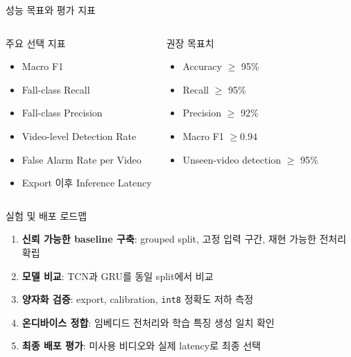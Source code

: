 \documentclass[aspectratio=169]{beamer}
\begin{document}
\begin{frame}{성능 목표와 평가 지표}
  \begin{columns}[T]
    \begin{block}{주요 선택 지표}
      \begin{itemize}
        \item Macro F1
        \item Fall-class Recall
        \item Fall-class Precision
        \item Video-level Detection Rate
        \item False Alarm Rate per Video
        \item Export 이후 Inference Latency
      \end{itemize}
    \end{block}

    \begin{block}{권장 목표치}
      \begin{itemize}
        \item Accuracy $\geq$ 95\%
        \item Recall $\geq$ 95\%
        \item Precision $\geq$ 92\%
        \item Macro F1 $\geq 0.94$
        \item Unseen-video detection $\geq$ 95\%
      \end{itemize}
    \end{block}
  \end{columns}
\end{frame}

\begin{frame}{실험 및 배포 로드맵}
  \begin{enumerate}
    \item \textbf{신뢰 가능한 baseline 구축}: grouped split, 고정 입력 구간, 재현 가능한 전처리 확립
    \item \textbf{모델 비교}: TCN과 GRU를 동일 split에서 비교
    \item \textbf{양자화 검증}: export, calibration, \texttt{int8} 정확도 저하 측정
    \item \textbf{온디바이스 정합}: 임베디드 전처리와 학습 특징 생성 일치 확인
    \item \textbf{최종 배포 평가}: 미사용 비디오와 실제 latency로 최종 선택
  \end{enumerate}
\end{frame}
\end{document}
